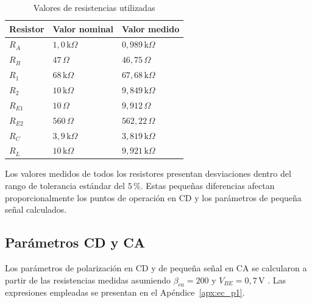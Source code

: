 \documentclass[journal]{IEEEtran}
\begin{document}
\begin{table}[!ht]
    \centering
    \caption{Valores de resistencias utilizadas}
    \begin{tabular}{|>{\centering\arraybackslash}m{1.3cm}|
                     >{\centering\arraybackslash}m{2.5cm}|
                     >{\centering\arraybackslash}m{2.5cm}|}
        \hline
        Resistor & Valor nominal & Valor medido \\
        \hline
        $R_A$    & $1{,}0\,\text{k}\Omega$  & $0{,}989\,\text{k}\Omega$ \\
        \hline
        $R_B$    & $47\,\Omega$              & $46{,}75\,\Omega$          \\
        \hline
        $R_1$    & $68\,\text{k}\Omega$      & $67{,}68\,\text{k}\Omega$  \\
        \hline
        $R_2$    & $10\,\text{k}\Omega$      & $9{,}849\,\text{k}\Omega$  \\
        \hline
        $R_{E1}$ & $10\,\Omega$              & $9{,}912\,\Omega$          \\
        \hline
        $R_{E2}$ & $560\,\Omega$             & $562{,}22\,\Omega$         \\
        \hline
        $R_C$    & $3{,}9\,\text{k}\Omega$   & $3{,}819\,\text{k}\Omega$  \\
        \hline
        $R_L$    & $10\,\text{k}\Omega$      & $9{,}921\,\text{k}\Omega$  \\
        \hline
    \end{tabular}
    \label{tab:resistencias}
\end{table}

Los valores medidos de todos los resistores presentan desviaciones dentro del rango de tolerancia est\'andar del $5\,\%$. Estas peque\~nas diferencias afectan proporcionalmente los puntos de operaci\'on en CD y los par\'ametros de peque\~na se\~nal calculados.


\subsection{Par\'ametros CD y CA}

Los par\'ametros de polarizaci\'on en CD y de peque\~na se\~nal en CA se calcularon a partir de las resistencias medidas asumiendo $\beta_{ca} = 200$ y $V_{BE} = 0{,}7\,\text{V}$ \cite{Floyd2008}. Las expresiones empleadas se presentan en el Ap\'endice~\ref{apx:ec_p1}.
\end{document}
